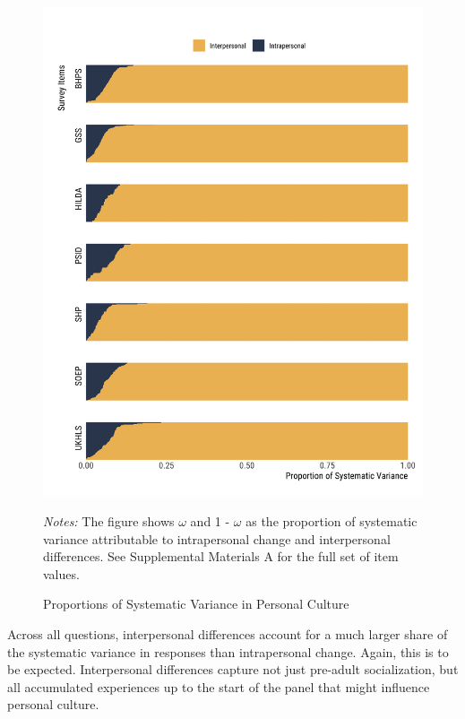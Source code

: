 \documentclass[
  11pt,
]{article}
\begin{document}
\begin{figure}[ht]
\begin{center}
\caption{Proportions of Systematic Variance in Personal Culture}

\begin{center}\includegraphics[width=1\linewidth]{../../figures/omegas} \end{center}

\end{center}
\footnotesize{\textit{Notes:} The figure shows $\omega$ and 1 - $\omega$ as the proportion of systematic variance attributable to intrapersonal change and interpersonal differences. See Supplemental Materials A for the full set of item values.}
\end{figure}

Across all questions, interpersonal differences account for a much
larger share of the systematic variance in responses than intrapersonal
change. Again, this is to be expected. Interpersonal differences capture
not just pre-adult socialization, but all accumulated experiences up to
the start of the panel that might influence personal culture.
\end{document}
